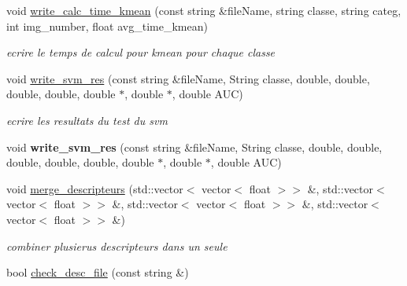 \begin{DoxyCompactItemize}
\item 
\hypertarget{class_fichiers_ab8c9b6dd60a7ba8deea400ba47630f2c}{
void \hyperlink{class_fichiers_ab8c9b6dd60a7ba8deea400ba47630f2c}{write\_\-calc\_\-time\_\-kmean} (const string \&fileName, string classe, string categ, int img\_\-number, float avg\_\-time\_\-kmean)}
\label{class_fichiers_ab8c9b6dd60a7ba8deea400ba47630f2c}

\begin{DoxyCompactList}\small\item\em ecrire le temps de calcul pour kmean pour chaque classe \end{DoxyCompactList}\item 
\hypertarget{class_fichiers_a2c339cd17a1446b1b72b33b40d664fa1}{
void \hyperlink{class_fichiers_a2c339cd17a1446b1b72b33b40d664fa1}{write\_\-svm\_\-res} (const string \&fileName, String classe, double, double, double, double, double $\ast$, double $\ast$, double AUC)}
\label{class_fichiers_a2c339cd17a1446b1b72b33b40d664fa1}

\begin{DoxyCompactList}\small\item\em ecrire les resultats du test du svm \end{DoxyCompactList}\item 
\hypertarget{class_fichiers_a76bb0551c36961caeafa9ffa203005bd}{
void {\bfseries write\_\-svm\_\-res} (const string \&fileName, String classe, double, double, double, double, double, double $\ast$, double $\ast$, double AUC)}
\label{class_fichiers_a76bb0551c36961caeafa9ffa203005bd}

\item 
\hypertarget{class_fichiers_aba2d6ed855381d069e08edb562573605}{
void \hyperlink{class_fichiers_aba2d6ed855381d069e08edb562573605}{merge\_\-descripteurs} (std::vector$<$ vector$<$ float $>$$>$ \&, std::vector$<$ vector$<$ float $>$$>$ \&, std::vector$<$ vector$<$ float $>$$>$ \&, std::vector$<$ vector$<$ float $>$$>$ \&)}
\label{class_fichiers_aba2d6ed855381d069e08edb562573605}

\begin{DoxyCompactList}\small\item\em combiner plusierus descripteurs dans un seule \end{DoxyCompactList}\item 
\hypertarget{class_fichiers_af3279bfc9cf06e42e2d8d2e14c383d89}{
bool \hyperlink{class_fichiers_af3279bfc9cf06e42e2d8d2e14c383d89}{check\_\-desc\_\-file} (const string \&)}
\label{class_fichiers_af3279bfc9cf06e42e2d8d2e14c383d89}


\end{DoxyCompactItemize}
